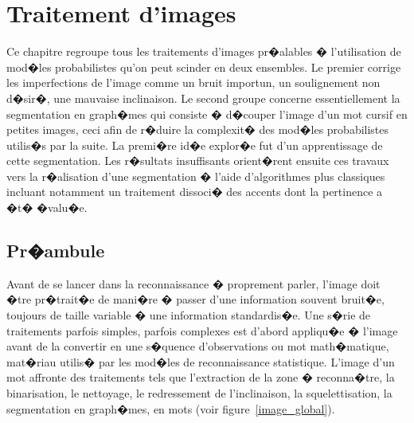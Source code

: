 %
\firstpassagedo{}
%



\sloppy

\chapter{Traitement d'images}

\label{image_chapitre_label}


Ce chapitre regroupe tous les traitements d'images pr�alables � l'utilisation de mod�les probabilistes qu'on peut scinder en deux ensembles. Le premier corrige les imperfections de l'image comme un bruit importun, un soulignement non d�sir�, une mauvaise inclinaison. Le second groupe concerne essentiellement la segmentation en graph�mes qui consiste � d�couper l'image d'un mot cursif en petites images, ceci afin de r�duire la complexit� des mod�les probabilistes utilis�s par la suite. La premi�re id�e explor�e fut d'un apprentissage de cette segmentation. Les r�sultats insuffisants orient�rent ensuite ces travaux vers la r�alisation d'une segmentation � l'aide d'algorithmes plus classiques incluant notamment un traitement dissoci� des accents dont la pertinence a �t� �valu�e.


\section{Pr�ambule}



Avant de se lancer dans la reconnaissance � proprement parler, l'image doit �tre pr�trait�e de mani�re � passer d'une information souvent bruit�e, toujours de taille variable � une information standardis�e. Une s�rie de traitements parfois simples, parfois complexes est d'abord appliqu�e � l'image avant de la convertir en une s�quence d'observations ou mot math�matique, mat�riau utilis� par les mod�les de reconnaissance statistique. L'image d'un mot affronte des traitements tels que l'extraction de la zone � reconna�tre, la binarisation, le nettoyage, le redressement de l'inclinaison, la squelettisation, la segmentation en graph�mes, en mots (voir figure~\ref{image_global}).
            
